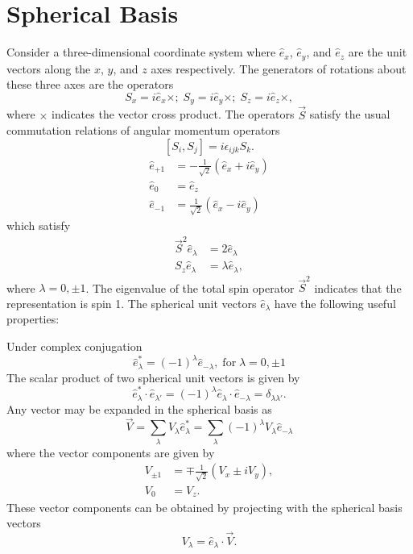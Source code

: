 \documentclass{book}[12pt]
\begin{document}
\section{Spherical Basis}
Consider a three-dimensional coordinate system where $\hat{e}_x$, $\hat{e}_y$, and $\hat{e}_z$ are the unit vectors along the $x$, $y$, and $z$ axes respectively. The generators of rotations about these three axes are the operators 
\begin{equation}
S_x=i\hat{e}_x\times;\;S_y=i\hat{e}_y\times;\;S_z=i\hat{e}_z\times,
\end{equation}
where $\times$ indicates the vector cross product. The operators $\vec{S}$ satisfy the usual commutation relations of angular momentum operators
\begin{equation}
\left[S_i,S_j\right]=i\epsilon_{ijk}S_k.
\end{equation}
\begin{equation}
\begin{split}
\hat{e}_{+1}&=-\frac{1}{\sqrt{2}}\left(\hat{e}_x+i\hat{e}_y\right)\\
\hat{e}_0&=\hat{e}_z\\
\hat{e}_{-1}&=\frac{1}{\sqrt{2}}\left(\hat{e}_x-i\hat{e}_y\right)
\end{split}
\end{equation}
which satisfy
\begin{equation}
\begin{split}
\vec{S}^2\hat{e}_\lambda&=2\hat{e}_\lambda\\
S_z\hat{e}_\lambda&=\lambda\hat{e}_\lambda,
\end{split}
\end{equation}
where $\lambda=0,\pm 1$. The eigenvalue of the total spin operator $\vec{S}^2$ indicates that the representation is spin 1. The spherical unit vectors $\hat{e}_\lambda$ have the following useful properties:

Under complex conjugation
\begin{equation}
\hat{e}_\lambda^*=(-1)^\lambda\hat{e}_{-\lambda},\;\mathrm{for}\;\lambda=0,\pm 1
\end{equation}
The scalar product of two spherical unit vectors is given by 
\begin{equation}
\hat{e}_\lambda^*\cdot\hat{e}_{\lambda'}=(-1)^\lambda\hat{e}_\lambda\cdot\hat{e}_{-\lambda}=\delta_{\lambda\lambda'}.
\end{equation}
Any vector may be expanded in the spherical basis as
\begin{equation}
\vec{V}=\sum_\lambda V_\lambda \hat{e}_\lambda^*=\sum_{\lambda}(-1)^\lambda V_\lambda \hat{e}_{-\lambda}
\end{equation}
where the vector components are given by
\begin{equation}
\begin{split}
V_{\pm 1}&=\mp \frac{1}{\sqrt{2}}\left(V_x\pm i V_y\right),\\
V_0&=V_z.
\end{split}
\end{equation}
These vector components can be obtained by projecting with the spherical basis vectors
\begin{equation}
V_\lambda=\hat{e}_\lambda\cdot\vec{V}.
\end{equation}
\end{document}
